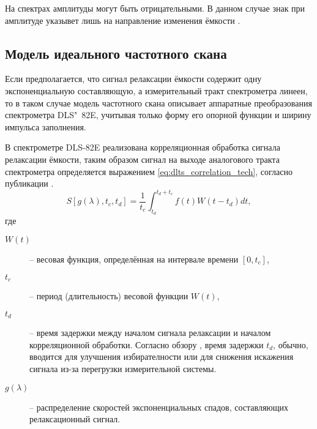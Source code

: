     На спектрах амплитуды могут быть отрицательными. В данном случае знак при
    амплитуде указывет лишь на направление изменения ёмкости \cite{rp_vak}.


    \subsection{Модель идеального частотного скана}
    Если предполагается, что сигнал релаксации ёмкости содержит одну 
    экспоненциальную составляющую, а измерительный тракт спектрометра линеен, 
    то в таком случае модель частотного скана описывает аппаратные преобразования 
    спектрометра DLS"~82E, учитывая только форму его опорной функции и ширину
    импульса заполнения.

    В спектрометре DLS-82E реализована корреляционная обработка сигнала
    релаксации ёмкости, таким образом сигнал на выходе аналогового тракта
    спектрометра определяется выражением \ref{eq:dlts_correlation_tech},
    согласно публикации \cite{istratov_exp_analysis}.
    \begin{equation}
        \label{eq:dlts_correlation_tech}
        S\left[g(\lambda),t_c,t_d\right]=\frac{1}{t_c}\int_{t_d}^{t_d+t_c}
        f(t)W\left(t-t_d\right)dt ,
    \end{equation}
    где
    \begin{description}
        \item[$W(t)$] -- весовая функция, определённая на интервале 
        времени $\left[0,t_c\right]$,
        \item[$t_c$] -- период (длительность) весовой функции $W(t)$,
        \item[$t_d$] -- время задержки между началом сигнала релаксации
        и началом корреляционной обработки. Согласно обзору 
        \cite{istratov_exp_analysis}, время задержки $t_d$, обычно, 
        вводится для улучшения избирателности или для снижения искажения
        сигнала из-за перегрузки измерительной системы.
        \item[$g(\lambda)$] -- распределение скоростей экспоненциальных
        спадов, составляющих релаксационный сигнал.
    \end{description}

